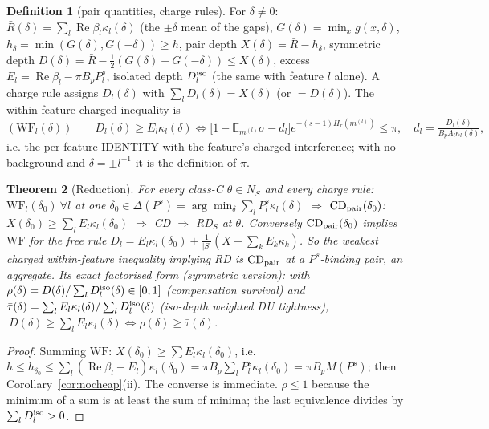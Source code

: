 \documentclass[11pt]{article}
\newtheorem{theorem}{Theorem}
\theoremstyle{definition}
\newtheorem{definition}[theorem]{Definition}
\newcommand{\Re}{\operatorname{Re}}
\begin{document}
\begin{definition}[pair quantities, charge rules]
For $\delta\ne0$: $\bar R(\delta)=\sum_l\Re\beta_l\kappa_l(\delta)$ (the $\pm\delta$ mean of the gaps), $G(\delta)=\min_xg(x,\delta)$,
$h_\delta=\min(G(\delta),G(-\delta))\ge h$, pair depth $X(\delta)=\bar R-h_\delta$, symmetric depth $D(\delta)=\bar R-\tfrac12(G(\delta)+G(-\delta))\le X(\delta)$,
excess $E_l=\Re\beta_l-\pi B_pP_l^s$, isolated depth $D_l^{\rm iso}$ (the same with feature $l$ alone).
A charge rule assigns $D_l(\delta)$ with $\sum_lD_l(\delta)=X(\delta)$ (or $=D(\delta)$). The within-feature charged inequality is
\[(\mathrm{WF}_l(\delta))\qquad D_l(\delta)\ge E_l\kappa_l(\delta)\iff\big[1-\mathbb E_{m^{(l)}}\sigma-d_l\big]e^{-(s-1)H_r(m^{(l)})}\le\pi,
\quad d_l=\tfrac{D_l(\delta)}{B_pA_l\kappa_l(\delta)} ,\]
i.e. the per-feature IDENTITY with the feature's charged interference; with no background and $\delta=\pm l^{-1}$ it is the definition of $\pi$.
\end{definition}

\begin{theorem}[Reduction]\label{thm:red}
For every class-C $\theta\in N_S$ and every charge rule:
$\mathrm{WF}_l(\delta_0)\ \forall l$ at one $\delta_0\in\Delta(P^s)=\arg\min_\delta\sum_lP_l^s\kappa_l(\delta)$
$\Rightarrow$ $\mathrm{CD}_{\rm pair}(\delta_0)$: $X(\delta_0)\ge\sum_lE_l\kappa_l(\delta_0)$ $\Rightarrow$ CD $\Rightarrow$ RD$_S$ at $\theta$.
Conversely $\mathrm{CD}_{\rm pair}(\delta_0)$ implies $\mathrm{WF}$ for the free rule $D_l=E_l\kappa_l(\delta_0)+\frac1{|S|}(X-\sum_kE_k\kappa_k)$.
So the weakest charged within-feature inequality implying RD is $\mathrm{CD}_{\rm pair}$ at a $P^s$-binding pair, an aggregate.
Its exact factorised form (symmetric version): with $\rho(\delta)=D(\delta)/\sum_lD^{\rm iso}_l(\delta)\in[0,1]$ (compensation survival)
and $\bar\tau(\delta)=\sum_lE_l\kappa_l(\delta)/\sum_lD^{\rm iso}_l(\delta)$ (iso-depth weighted DU tightness),
$\ D(\delta)\ge\sum_lE_l\kappa_l(\delta)\iff\rho(\delta)\ge\bar\tau(\delta)$.
\end{theorem}
\begin{proof} Summing $\mathrm{WF}$: $X(\delta_0)\ge\sum E_l\kappa_l(\delta_0)$, i.e. $h\le h_{\delta_0}\le\sum_l(\Re\beta_l-E_l)\kappa_l(\delta_0)
=\pi B_p\sum_lP_l^s\kappa_l(\delta_0)=\pi B_pM(P^s)$; then Corollary~\ref{cor:nocheap}(ii). The converse is immediate. $\rho\le1$ because
the minimum of a sum is at least the sum of minima; the last equivalence divides by $\sum_lD_l^{\rm iso}>0$.\end{proof}
\end{document}
